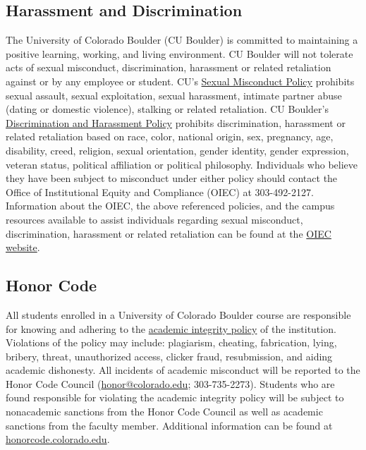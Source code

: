 \documentclass[10pt]{memoir}
\begin{document}
\subsection{Harassment and Discrimination}
The University of Colorado Boulder (CU Boulder) is committed to maintaining a positive learning, working, and living environment. CU Boulder will not tolerate acts of sexual misconduct, discrimination, harassment or related retaliation against or by any employee or student. CU's \href{http://www.colorado.edu/policies/discrimination-and-harassment-policy-and-procedures}{Sexual Misconduct Policy} prohibits sexual assault, sexual exploitation, sexual harassment, intimate partner abuse (dating or domestic violence), stalking or related retaliation. CU Boulder's \href{http://www.colorado.edu/policies/discrimination-and-harassment-policy-and-procedures}{Discrimination and Harassment Policy} prohibits discrimination, harassment or related retaliation based on race, color, national origin, sex, pregnancy, age, disability, creed, religion, sexual orientation, gender identity, gender expression, veteran status, political affiliation or political philosophy. Individuals who believe they have been subject to misconduct under either policy should contact the Office of Institutional Equity and Compliance (OIEC) at 303-492-2127. Information about the OIEC, the above referenced policies, and the campus resources available to assist individuals regarding sexual misconduct, discrimination, harassment or related retaliation can be found at the \href{http://www.colorado.edu/institutionalequity/}{OIEC website}.

\subsection{Honor Code}
All students enrolled in a University of Colorado Boulder course are responsible for knowing and adhering to the \href{http://www.colorado.edu/policies/academic-integrity-policy}{academic integrity policy} of the institution. Violations of the policy may include: plagiarism, cheating, fabrication, lying, bribery, threat, unauthorized access, clicker fraud, resubmission, and aiding academic dishonesty. All incidents of academic misconduct will be reported to the Honor Code Council (\href{mailto:honor@colorado.edu}{honor@colorado.edu}; 303-735-2273). Students who are found responsible for violating the academic integrity policy will be subject to nonacademic sanctions from the Honor Code Council as well as academic sanctions from the faculty member. Additional information can be found at \href{http://honorcode.colorado.edu}{honorcode.colorado.edu}. 
\end{document}
